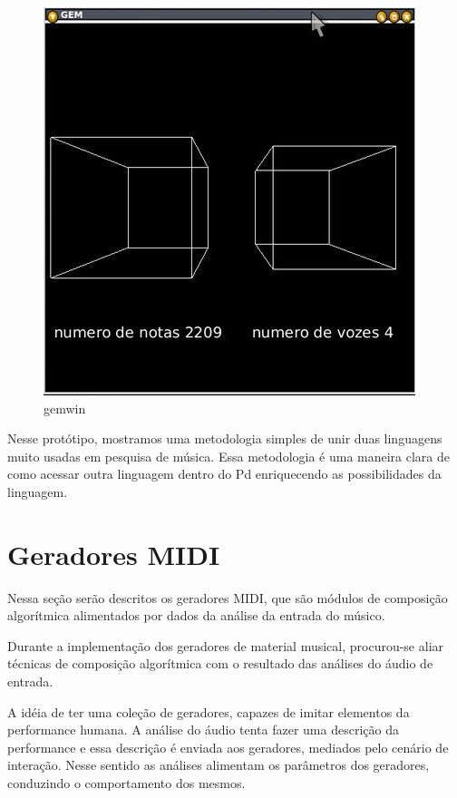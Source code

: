 \documentclass[draft]{ppgmus}
\begin{document}
\begin{figure}
\includegraphics[scale=.5]{gemwin}
\caption{gemwin}
\label{gemwin}
\end{figure} 



  Nesse protótipo, mostramos uma metodologia
simples de unir duas linguagens muito usadas em pesquisa de música.
Essa metodologia é uma maneira clara de como acessar outra linguagem dentro do Pd
enriquecendo as possibilidades da linguagem.


\pagebreak





\section{Geradores MIDI}


Nessa seção serão descritos os geradores MIDI, que
são módulos de composição algorítmica alimentados
por dados da análise da entrada do músico.

Durante a implementação dos geradores de material musical,
procurou-se aliar técnicas de composição algorítmica com
o resultado das análises do áudio de entrada.


A idéia de ter uma coleção de geradores, capazes
de imitar elementos da performance humana. A análise do áudio
tenta fazer uma descrição da performance e essa descrição
é enviada aos geradores, mediados pelo cenário de interação.
Nesse sentido as análises alimentam os parâmetros dos
geradores, conduzindo o comportamento dos mesmos.
\end{document}

